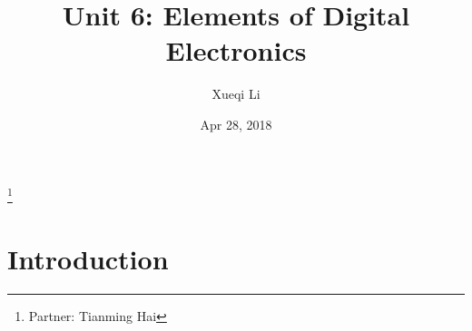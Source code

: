 \documentclass[aps,prl,reprint]{revtex4-1}
\begin{document}
\title{Unit 6: Elements of Digital Electronics}
\author{Xueqi Li}
\thanks{Partner: Tianming Hai}
\noaffiliation
\date{Apr 28, 2018}



\maketitle

\section{Introduction}  
\end{document}
